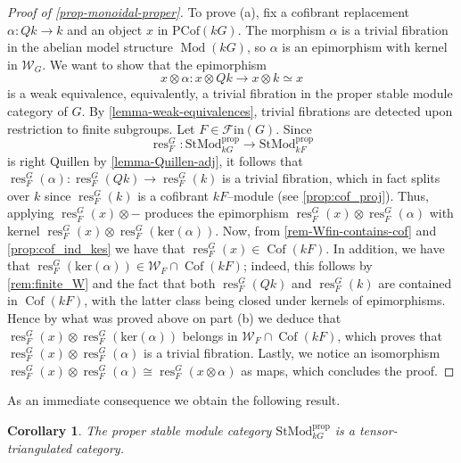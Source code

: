 \documentclass{amsart}
\newcommand{\res}{\operatorname{res}\nolimits}
\def \W{{\mathcal W}}
\def \Fin{{\mathcal{F}\textrm{in}}}
\def \Wfin{{\mathcal W}_{G}}
\DeclareMathOperator{\Mod}{Mod}
\DeclareMathOperator{\Cof}{Cof}
\numberwithin{equation}{section}%
\newtheorem{corollary}[equation]{Corollary}
\theoremstyle{remark}
\begin{document}
{\begin{proof}[Proof of \cref{prop-monoidal-proper}]
To prove (a), fix a cofibrant replacement $\alpha\colon Qk\to k$ and an object $x$ in $\mathrm{PCof}(kG)$. The morphism $\alpha$ is a trivial fibration in the abelian model structure $\Mod(kG)$, so $\alpha$ is an epimorphism with kernel in $\Wfin$. We want to show that the epimorphism 
\[
x\otimes \alpha\colon x\otimes Qk\to x\otimes k\simeq x
\]
is a weak equivalence, equivalently, a trivial fibration in the proper stable module category of $G$.
By \cref{lemma-weak-equivalences},  trivial fibrations are detected upon restriction to finite subgroups. Let $F\in \Fin(G)$. Since 
\[
\res^G_F \colon \mathrm{StMod}^{\mathrm{prop}}_{kG}\to \mathrm{StMod}^{\mathrm{prop}}_{kF}
\]
is right Quillen by \cref{lemma-Quillen-adj}, it follows that $\res^G_F(\alpha)\colon\res^G_F(Qk)\rightarrow \res^G_F(k)$ is a trivial fibration, which in fact splits over $k$ since $\res^G_F(k)$ is a cofibrant $kF$--module (see \cref{prop:cof_proj}). 
Thus, applying $\res^G_F(x)\otimes-$ produces the epimorphism $\res^G_F(x)\otimes\res^G_F(\alpha)$ with kernel $\res^G_F(x)\otimes\res^G_F(\mathrm{ker}(\alpha))$.
Now, from \cref{rem-Wfin-contains-cof} and \cref{prop:cof_ind_kes} we have that $\res^G_F(x)\in\Cof(kF)$. In addition, we have that $\res^G_F(\mathrm{ker}(\alpha))\in\W_{F}\cap \Cof(kF)$; indeed, this  follows by \cref{rem:finite_W} and the fact that both $\res^G_F(Qk)$ and $\res^G_F(k)$ are contained in $\Cof(kF)$, with the latter class being closed under kernels of epimorphisms. Hence by what was proved above on part (b) we deduce that $\res^G_F(x)\otimes\res^G_F(\mathrm{ker}(\alpha))$ belongs in $\W_{F}\cap \Cof(kF)$, which proves that $\res^G_F(x)\otimes\res^G_F(\alpha)$ is a trivial fibration. Lastly, we notice an isomorphism $\res^G_F(x)\otimes\res^G_F(\alpha)\cong \res^G_F(x\otimes \alpha)$ as maps, which concludes the proof.
\end{proof}

As an immediate consequence we obtain the following result.

\begin{corollary}\label{coro-proper-ttcat}
     The proper stable module category $\mathrm{StMod}^{\mathrm{prop}}_{kG}$ is a tensor-triangulated category. 
\end{corollary}


}
\end{document}
